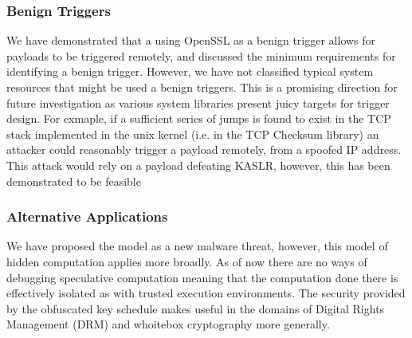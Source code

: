 \subsubsection{Benign Triggers}
We have demonstrated that a using OpenSSL as a benign trigger allows for 
\speculake payloads to be triggered remotely, and discussed the minimum 
requirements for identifying a benign trigger. However, we have not classified
typical system resources that might be used a benign triggers. This is a 
promising direction for future investigation as various system libraries present 
juicy targets for trigger design. For exmaple, if a sufficient series of jumps 
is found to exist in the TCP stack implemented in the unix kernel (i.e. in the TCP
Checksum library) an attacker could reasonably trigger a \speculake payload remotely,
from a spoofed IP address. This attack would rely on a payload defeating KASLR, 
however, this has been demonstrated to be feasible~\cite{gruss2017kaslr,evtyushkin2016jump}

\subsubsection{Alternative Applications}
We have proposed the \speculake model as a new malware threat, however, this model
of hidden computation applies more broadly. As of now there are no ways of 
debugging speculative computation meaning that the computation done there is effectively
isolated as with trusted execution environments. The security provided by the obfuscated 
key schedule makes \speculake useful in the domains of Digital Rights Management (DRM)
and whoitebox cryptography more generally. 



